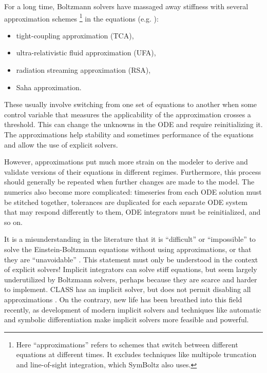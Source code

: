 \documentclass{aa}
\begin{document}
For a long time, Boltzmann solvers have massaged away stiffness with several approximation schemes%
\footnote{Here \enquote{approximations} refers to schemes that switch between different equations at different times. It excludes techniques like multipole truncation and line-of-sight integration, which SymBoltz also uses.}
in the equations (e.g. \cite{doranSpeedingCosmologicalBoltzmann2005,blasCosmicLinearAnisotropy2011a}):
\begin{itemize}
\item tight-coupling approximation (TCA),
\item ultra-relativistic fluid approximation (UFA),
\item radiation streaming approximation (RSA),
\item Saha approximation.
\end{itemize}
These usually involve switching from one set of equations to another when some control variable that measures the applicability of the approximation crosses a threshold.
This can change the unknowns in the ODE and require reinitializing it.
The approximations help stability and sometimes performance of the equations and allow the use of explicit solvers.

However, approximations put much more strain on the modeler to derive and validate versions of their equations in different regimes.
Furthermore, this process should generally be repeated when further changes are made to the model.
The numerics also become more complicated: timeseries from each ODE solution must be stitched together, tolerances are duplicated for each separate ODE system that may respond differently to them, ODE integrators must be reinitialized, and so on.

It is a misunderstanding in the literature that it is \enquote{difficult} or \enquote{impossible} to solve the Einstein-Boltzmann equations without using approximations, or that they are \enquote{unavoidable} \citep[][respectively]{maCosmologicalPerturbationTheory1995,lewisCAMBNotes2025,lesgourguesCosmicLinearAnisotropy2011}.
This statement must only be understood in the context of explicit solvers!
Implicit integrators can solve stiff equations, but seem largely underutilized by Boltzmann solvers, perhaps because they are scarce and harder to implement.
CLASS has an implicit solver, but does not permit disabling all approximations \cite{blasCosmicLinearAnisotropy2011a}.
On the contrary, new life has been breathed into this field recently, as development of modern implicit solvers and techniques like automatic and symbolic differentiation make implicit solvers more feasible and powerful.
\end{document}

